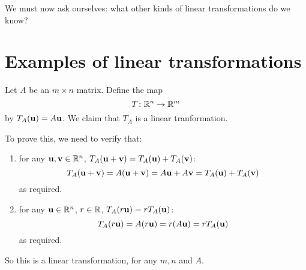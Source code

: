 We must now ask ourselves:  what other kinds of linear transformations
do we know?



\section{Examples of linear transformations}

\begin{myexample} \label{ex:multmatlintrans} Let $A$ be an $m\times n$ matrix.  Define the map
$$T \colon \mathbb{R}^n \to \mathbb{R}^m
$$
by $T_A(\mathbf{u}) = A\mathbf{u}$.  We claim that $T_A$ is a linear tranformation.

To prove this, we need to verify that:
\begin{enumerate}
\item for any $\mathbf{u},\mathbf{v} \in \mathbb{R}^n$, $T_A(\mathbf{u}+\mathbf{v}) = T_A(\mathbf{u}) +T_A(\mathbf{v})$:
$$
T_A(\mathbf{u}+\mathbf{v}) = A(\mathbf{u} + \mathbf{v}) = A\mathbf{u} + A\mathbf{v} =  T_A(\mathbf{u}) +T_A(\mathbf{v})
$$
as required.
\item for any $\mathbf{u} \in \mathbb{R}^n$, $r\in \mathbb{R}$, $T_A(r\mathbf{u}) = rT_A(\mathbf{u})$:
$$
T_A(r\mathbf{u}) = A(r\mathbf{u}) = r(A\mathbf{u}) = rT_A(\mathbf{u})
$$
as required.
\end{enumerate}
So this is a linear transformation, for any $m,n$ and $A$.
\end{myexample}

